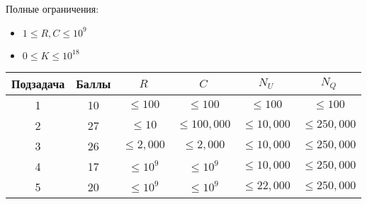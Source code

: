Полные ограничения:
\begin{itemize}
\item $1 \leq R, C \leq 10^9$
\item $0 \leq K \leq 10^{18}$
\end{itemize}
\begin{center}
\begin{tabular}{ |c|c|c|c|c|c| }
\hline
Подзадача & Баллы & $R$ & $C$ & $N_U$ & $N_Q$\\
\hline
1 & 10 & $\leq 100$ & $\leq 100$ & $\leq 100$ & $\leq 100$\\
\hline
2 & 27 & $\leq 10$ & $\leq 100,000$ & $\leq 10,000$ & $\leq 250,000$\\
\hline
3 & 26 & $\leq 2,000$ & $\leq 2,000$ & $\leq 10,000$ & $\leq 250,000$\\
\hline
4 & 17 & $\leq 10^9$ & $\leq 10^9$ & $\leq 10,000$ & $\leq 250,000$\\
\hline
5 & 20 & $\leq 10^9$ & $\leq 10^9$ & $\leq 22,000$ & $\leq 250,000$\\
\hline
\end{tabular}
\end{center}